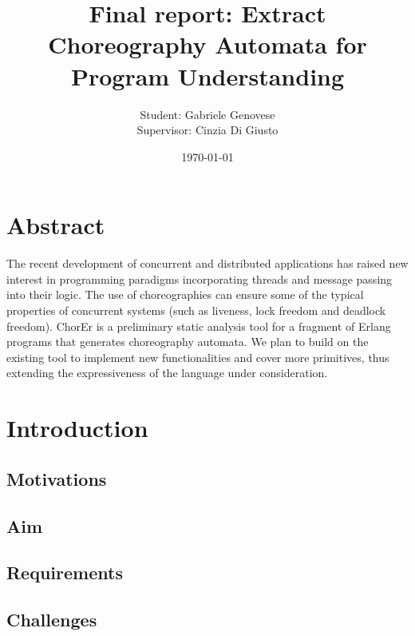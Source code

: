 \documentclass{article}
\title{Final report: Extract Choreography Automata for Program Understanding}
\author{Student: Gabriele Genovese\\Supervisor: Cinzia Di Giusto}
\date{\today}
\theoremstyle{definition}
\theoremstyle{definition}
\begin{document}
\maketitle


\section*{Abstract}
The recent development of concurrent and distributed applications has raised new interest in programming paradigms incorporating threads and message passing into their logic. The use of choreographies
can ensure some of the typical properties of concurrent systems (such as liveness, lock freedom and deadlock freedom). ChorEr is a preliminary static analysis tool for a fragment of Erlang programs that generates choreography automata. We plan to build on the existing tool to implement new functionalities and cover more primitives, thus extending the expressiveness of the language under consideration.

\newpage

\tableofcontents

\newpage

\section{Introduction}


\subsection{Motivations}


\subsection{Aim}


\subsection{Requirements}


\subsection{Challenges}


% 
\end{document}

